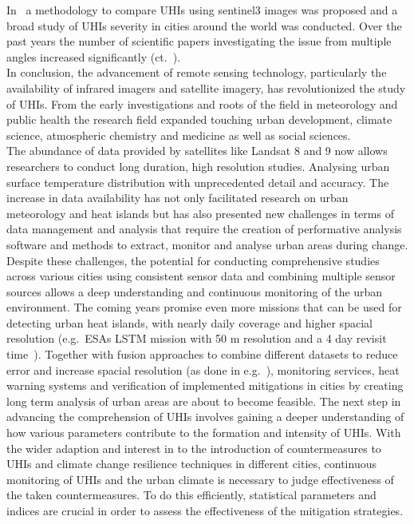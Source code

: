 \documentclass[12pt,a4paper, english,twoside]{scrartcl}
\begin{document}
  In~\cite{Sobrino2020} a methodology to compare \glspl{UHI} using \gls{sentinel3} images was proposed and a broad study of \glspl{UHI} severity in cities around the world was conducted.
  Over the past years the number of scientific papers investigating the issue from multiple angles increased significantly (ct.~\cite[P. 3]{Piracha2022b}).\\
  In conclusion, the advancement of remote sensing technology, particularly the availability of infrared imagers and satellite imagery, has revolutionized the study of \glspl{UHI}. 
  From the early investigations and roots of the field in meteorology and public health the research field expanded touching urban development, climate science, atmospheric chemistry and medicine as well as social sciences.\\
  The abundance of data provided by satellites like Landsat 8 and 9 now allows researchers to conduct long duration, high resolution studies.
  Analysing urban surface temperature distribution with unprecedented detail and accuracy.
  The increase in data availability has not only facilitated research on urban meteorology and heat islands but has also presented new challenges in terms of data management and analysis that require the creation of performative analysis software and methods to extract, monitor and analyse urban areas during change.
  Despite these challenges, the potential for conducting comprehensive studies across various cities using consistent sensor data and combining multiple sensor sources allows a deep understanding and continuous monitoring of the urban environment.
  The coming years promise even more missions that can be used for detecting urban heat islands, with nearly daily coverage and higher spacial resolution (e.g.~ESAs LSTM mission with 50 m resolution and a 4 day revisit time~\cite{CEOS2024}). 
  Together with fusion approaches to combine different datasets to reduce error and increase spacial resolution (as done in e.g.~\cite{CampsValls2009}), monitoring services, heat warning systems and verification of implemented mitigations in cities by creating long term analysis of urban areas are about to become feasible.
  The next step in advancing the comprehension of \glspl{UHI} involves gaining a deeper understanding of how various parameters contribute to the formation and intensity of \glspl{UHI}.
  With the wider adaption and interest in to the introduction of countermeasures to \glspl{UHI} and climate change resilience techniques in different cities, continuous monitoring of \glspl{UHI} and the urban climate is necessary to judge effectiveness of the taken countermeasures.
  To do this efficiently, statistical parameters and indices are crucial in order to assess the effectiveness of the mitigation strategies. 
\end{document}
